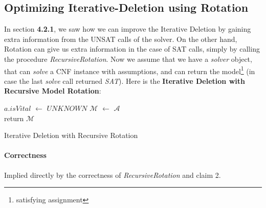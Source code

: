 \documentclass[]{article}
\begin{document}
	\pagebreak
	\subsection{Optimizing Iterative-Deletion using Rotation}
	In section \textbf{4.2.1}, we saw how we can improve the Iterative Deletion by gaining extra information from the UNSAT calls of the solver. On the other hand, Rotation can give us extra information in the case of SAT calls, simply by calling the procedure \textit{RecursiveRotation}. Now we assume that we have a \textit{solver} object, that can \textit{solve} a CNF instance with assumptions, and can return the model\footnote{satisfying assignment} (in case the last \textit{solve} call returned \textit{SAT}). Here is the \textbf{Iterative Deletion with Recursive Model Rotation}:
	
	\begin{algorithm}[H]
		 {
			$ a.isVital $ $\leftarrow$ $ UNKNOWN $
		}
		$ \mathcal{M} $ $\leftarrow$ $ \mathcal{A} $\\
		
		return $ \mathcal{M} $
	\caption{Iterative Deletion with Recursive Rotation}
	\end{algorithm}

	\paragraph{Correctness} Implied directly by the correctness of \textit{RecursiveRotation} and claim 2.
	
\end{document}
